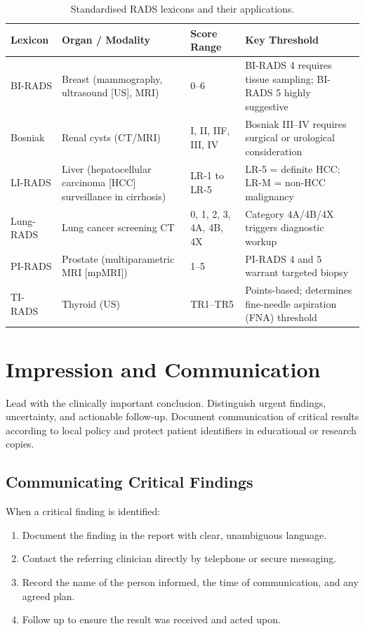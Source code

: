 \begin{table}[h]
\centering
\caption{Standardised RADS lexicons and their applications.}
\label{tab:radss}
\begin{tabular}{p{2.5cm} p{3.5cm} p{3cm} p{4.5cm}}
\toprule
\textbf{Lexicon} & \textbf{Organ / Modality} & \textbf{Score Range} & \textbf{Key Threshold} \\
\midrule
BI-RADS & Breast (mammography, ultrasound [US], MRI) & 0--6 & BI-RADS 4 requires tissue sampling; BI-RADS 5 highly suggestive \\
Bosniak & Renal cysts (CT/MRI) & I, II, IIF, III, IV & Bosniak III--IV requires surgical or urological consideration \\
LI-RADS & Liver (hepatocellular carcinoma [HCC] surveillance in cirrhosis) & LR-1 to LR-5 & LR-5 = definite HCC; LR-M = non-HCC malignancy \\
Lung-RADS & Lung cancer screening CT & 0, 1, 2, 3, 4A, 4B, 4X & Category 4A/4B/4X triggers diagnostic workup \\
PI-RADS & Prostate (multiparametric MRI [mpMRI]) & 1--5 & PI-RADS 4 and 5 warrant targeted biopsy \\
TI-RADS & Thyroid (US) & TR1--TR5 & Points-based; determines fine-needle aspiration (FNA) threshold \\
\bottomrule
\end{tabular}
\end{table}

\section{Impression and Communication}
Lead with the clinically important conclusion. Distinguish urgent findings, uncertainty, and actionable follow-up. Document communication of critical results according to local policy and protect patient identifiers in educational or research copies.

\subsection{Communicating Critical Findings}
When a critical finding is identified:
\begin{enumerate}
    \item Document the finding in the report with clear, unambiguous language.
    \item Contact the referring clinician directly by telephone or secure messaging.
    \item Record the name of the person informed, the time of communication, and any agreed plan.
    \item Follow up to ensure the result was received and acted upon.
\end{enumerate}

